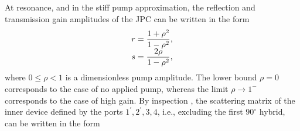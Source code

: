 \documentclass[aip,onecolumn,10pt]{revtex4}%
\begin{document}
At resonance, and in the stiff pump approximation, the reflection and transmission gain amplitudes of the JPC can be written in the form \cite{JPCnaturePhys}
\begin{align}
\begin{array}
[c]{cc}%
r=\dfrac{1+\rho^2}{1-\rho^2}, \\
s=\dfrac{2\rho}{1-\rho^2},  
\end{array}
\label{r_s_res}%
\end{align}
where $0\leq\rho<1$ is a dimensionless pump amplitude. The lower bound $\rho=0$ corresponds to the case of no applied pump, whereas the limit $\rho\longrightarrow1^-$ corresponds to the case of high gain. By inspection \cite{Pozar}, the scattering matrix of the inner device defined by the ports $1^{\prime}, 2^{\prime}, 3, 4$, i.e., excluding the first $90^{\circ}$ hybrid, can be written in the form \cite{JDA}
\end{document}
